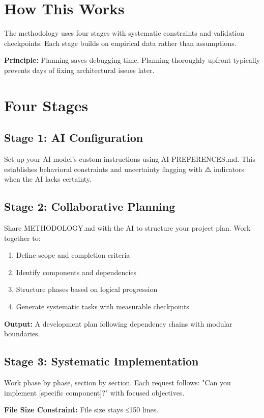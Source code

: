 \documentclass{article}
\begin{document}
\section{How This Works}
The methodology uses four stages with systematic constraints and validation checkpoints. Each stage builds on empirical data rather than assumptions.

\textbf{Principle:} Planning saves debugging time. Planning thoroughly upfront typically prevents days of fixing architectural issues later.

\section{Four Stages}

\subsection{Stage 1: AI Configuration}
Set up your AI model's custom instructions using AI-PREFERENCES.md. This establishes behavioral constraints and uncertainty flagging with ⚠️ indicators when the AI lacks certainty.

\subsection{Stage 2: Collaborative Planning}
Share METHODOLOGY.md with the AI to structure your project plan. Work together to:

\begin{enumerate}[noitemsep]
\item Define scope and completion criteria
\item Identify components and dependencies
\item Structure phases based on logical progression
\item Generate systematic tasks with measurable checkpoints
\end{enumerate}

\textbf{Output:} A development plan following dependency chains with modular boundaries.

\subsection{Stage 3: Systematic Implementation}
Work phase by phase, section by section. Each request follows: "Can you implement [specific component]?" with focused objectives.

\textbf{File Size Constraint:} File size stays ≤150 lines.
\end{document}

